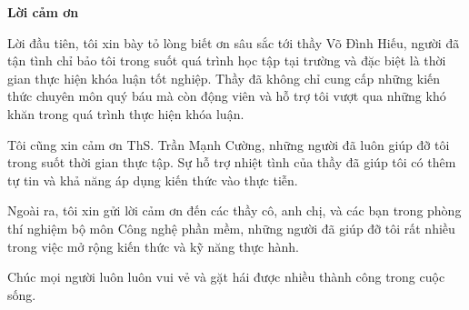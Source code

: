 \begin{center}
\textbf{\large{Lời cảm ơn}	}
\end{center}

Lời đầu tiên, tôi xin bày tỏ lòng biết ơn sâu sắc tới thầy Võ Đình Hiếu, người đã tận tình chỉ bảo tôi trong suốt quá trình học tập tại trường và đặc biệt là thời gian thực hiện khóa luận tốt nghiệp.
Thầy đã không chỉ cung cấp những kiến thức chuyên môn quý báu mà còn động viên và hỗ trợ tôi vượt qua những khó khăn trong quá trình thực hiện khóa luận.

Tôi cũng xin cảm ơn ThS. Trần Mạnh Cường, những người đã luôn giúp đỡ tôi trong suốt thời gian thực tập.
Sự hỗ trợ nhiệt tình của thầy đã giúp tôi có thêm tự tin và khả năng áp dụng kiến thức vào thực tiễn.

Ngoài ra, tôi xin gửi lời cảm ơn đến các thầy cô, anh chị, và các bạn trong phòng thí nghiệm bộ môn Công nghệ phần mềm, những người đã giúp đỡ tôi rất nhiều trong việc mở rộng kiến thức và kỹ năng thực hành.

Chúc mọi người luôn luôn vui vẻ và gặt hái được nhiều thành công trong cuộc sống.


